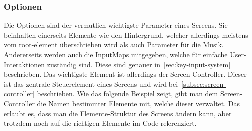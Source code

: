 \subsubsection{Optionen}\label{subsubsec:optionen}
\renewcommand{\kapitelautor}{Autor: Felix Zwickelstorfer}
Die Optionen sind der vermutlich wichtigste Parameter eines Screens.
Sie beinhalten einerseits Elemente wie den Hintergrund, welcher allerdings meistens vom root-element überschrieben wird als auch Parameter für die Musik.
Andererseits werden auch die InputMaps mitgegeben, welche für einfache User-Interaktionen zuständig sind.
Diese sind genauer in~\ref{sec:key-input-system} beschrieben.
Das wichtigste Element ist allerdings der Screen-Controller.
Dieser ist das zentrale Steuerelement eines Screens und wird bei~\ref{subsec:screen-controller} beschrieben.
Wie das folgende Beispiel zeigt, gibt man dem Screen-Controller die Namen bestimmter Elemente mit, welche dieser verwaltet.
Das erlaubt es, dass man die Elemente-Struktur des Screens ändern kann, aber trotzdem noch auf die richtigen Elemente im Code referenziert.

